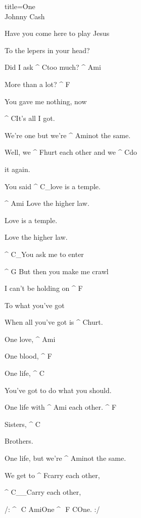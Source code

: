 \begin{song}{title=\predtitle\centering One \\\large Johnny Cash  \vspace*{-.3cm}}
\begin{centerjustified}
\begin{varwidth}[t]{0.55\textwidth}
	Have you come here to play Jesus

	To the lepers in your head?

	Did I ask ^{ C}too much? ^{ Ami}

	More than a lot? ^{ F}

	You gave me nothing, now
	   
	^{ C}It's all I got.

	We're one but we're ^{ Ami}not the same.

	Well, we ^{ F}hurt each other and we ^{ C}do

	it again.

	You said ^{ C{\color{white}\_}}love is a temple.

	^{ Ami\,\,}Love the higher law.

	Love is a temple.	

	Love the higher law.

	^{ C{\color{white}\_}}You ask me to enter

	^{ G\,\,}But then you make me crawl

	I can't be holding on ^{ F}
                  
	To what you've got

	When all you've got is ^{ C}hurt.


\end{varwidth}
\end{centerjustified}
\newpage
\begin{centerjustified}
\begin{varwidth}[t]{0.57\textwidth}\setlength{\parindent}{0.45cm}  %



\end{varwidth}\mezisloupci\begin{varwidth}[t]{0.55\textwidth}\setlength{\parindent}{0.45cm}

	One love, ^{ Ami}

	One blood, ^{ F}

	One life, ^{ C}
 
	You've got to do what you should.

	One life with ^{ Ami\,\,}each other. ^{ F}
 
 	Sisters, ^{ C}
 
	Brothers.
   
	One life, but we're ^{ Ami}not the same.

	We get to ^{ F}carry each other,

  	^{ C{\color{white}\_\_}}Carry each other,

  	/: ^{ \,\,C\,\,Ami}One ^{ \,\,F\,\,C}One. :/


\end{varwidth}
\end{centerjustified}

\setcounter{Slokočet}{0}
\end{song}
